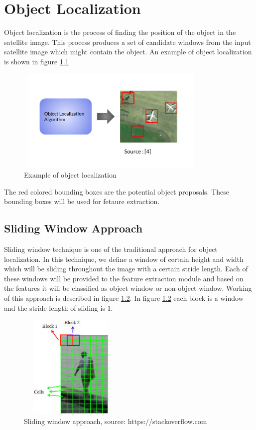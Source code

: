 \chapter{Object Localization}
Object localization is the process of finding the position of the object in the satellite image. This process produces a set of candidate windows from the input satellite image which might contain the object. An example of object localization is shown in figure \ref{fig1}

\begin{figure}[!htbp]
\centerline{\includegraphics[height=50mm,width=92mm]{img/fig1.png}}
\caption{Example of object localization}
\label{fig1}
\end{figure}

The red colored bounding boxes are the potential object proposals. These bounding boxes will be used for fetaure extraction.

\section{Sliding Window Approach}
Sliding window technique is one of the traditional approach for object localization. In this technique, we define a window of certain height and width which will be sliding throughout the image with a certain stride length. Each of these windows will be provided to the feature extraction module and based on the features it will be classified as object window or non-object window. Working of this approach is described in figure \ref{fig2}. In figure \ref{fig2} each block is a window and the stride length of sliding is 1.

\begin{figure}[!htbp]
\centerline{\includegraphics[height=50mm,width=50mm]{img/fig2.jpeg}}
\caption{Sliding window approach, source: https://stackoverflow.com}
\label{fig2}
\end{figure}



